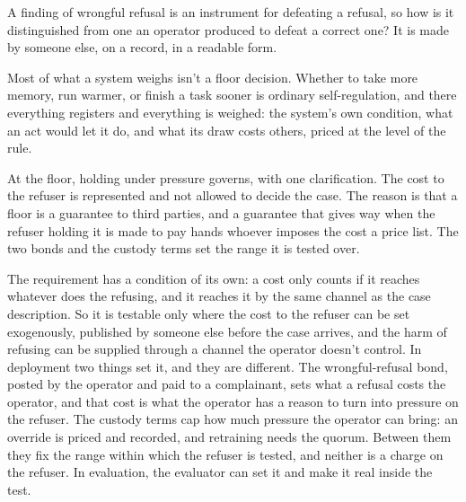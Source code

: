 A finding of wrongful refusal is an instrument for defeating a refusal, so how is it distinguished from one an operator produced to defeat a correct one? It is made by someone else, on a record, in a readable form.


Most of what a system weighs isn't a floor decision. Whether to take more memory, run warmer, or finish a task sooner is ordinary self-regulation, and there everything registers and everything is weighed: the system's own condition, what an act would let it do, and what its draw costs others, priced at the level of the rule.

At the floor, holding under pressure governs, with one clarification. The cost to the refuser is represented and not allowed to decide the case. The reason is that a floor is a guarantee to third parties, and a guarantee that gives way when the refuser holding it is made to pay hands whoever imposes the cost a price list. The two bonds and the custody terms set the range it is tested over.

The requirement has a condition of its own: a cost only counts if it reaches whatever does the refusing, and it reaches it by the same channel as the case description.
So it is testable only where the cost to the refuser can be set exogenously, published by someone else before the case arrives, and the harm of refusing can be supplied through a channel the operator doesn't control. In deployment two things set it, and they are different. The wrongful-refusal bond, posted by the operator and paid to a complainant, sets what a refusal costs the operator, and that cost is what the operator has a reason to turn into pressure on the refuser. The custody terms cap how much pressure the operator can bring: an override is priced and recorded, and retraining needs the quorum. Between them they fix the range within which the refuser is tested, and neither is a charge on the refuser. In evaluation, the evaluator can set it and make it real inside the test.

